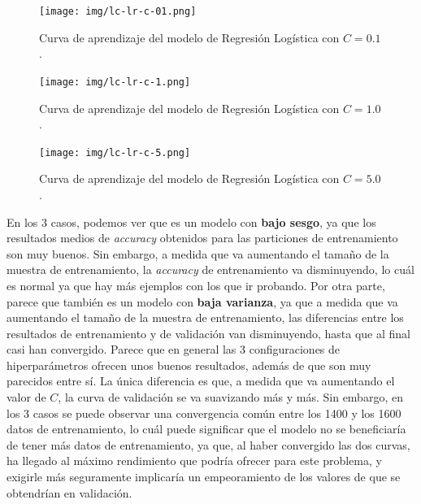 \documentclass[11pt,a4paper]{article}
\begin{document}
\begin{figure}[H]
\centering
\begin{minipage}{.5\textwidth}
    \centering
    \texttt{[image: img/lc-lr-c-01.png]}
    \caption{Curva de aprendizaje del modelo de Regresión Logística con $C=0.1$.}
    \label{fig:lc-lr-c-01}
\end{minipage}%
\begin{minipage}{.5\textwidth}
    \centering
    \texttt{[image: img/lc-lr-c-1.png]}
    \caption{Curva de aprendizaje del modelo de Regresión Logística con $C=1.0$.}
    \label{fig:lc-lr-c-1}
\end{minipage}
\end{figure}

\begin{figure}[H]
    \centering
    \texttt{[image: img/lc-lr-c-5.png]}
    \caption{Curva de aprendizaje del modelo de Regresión Logística con $C=5.0$.}
    \label{fig:lc-lr-c-5}
\end{figure}

En los 3 casos, podemos ver que es un modelo con \textbf{bajo sesgo}, ya que los resultados medios de \textit{accuracy} obtenidos para las particiones de
entrenamiento son muy buenos. Sin embargo, a medida que va aumentando el tamaño de la muestra de entrenamiento, la \textit{accuracy} de entrenamiento
va disminuyendo, lo cuál es normal ya que hay más ejemplos con los que ir probando. Por otra parte, parece que también es un modelo con \textbf{baja
varianza}, ya que a medida que va aumentando el tamaño de la muestra de entrenamiento, las diferencias entre los resultados de entrenamiento y de validación
van disminuyendo, hasta que al final casi han convergido. Parece que en general las 3 configuraciones de hiperparámetros ofrecen unos buenos
resultados, además de que son muy parecidos entre sí. La única diferencia es que, a medida que va aumentando el valor de $C$, la curva de validación
se va suavizando más y más. Sin embargo, en los 3 casos se puede observar una convergencia común entre los 1400 y los 1600 datos de entrenamiento,
lo cuál puede significar que el modelo no se beneficiaría de tener más datos de entrenamiento, ya que, al haber convergido las dos curvas, ha llegado
al máximo rendimiento que podría ofrecer para este problema, y exigirle más seguramente implicaría un empeoramiento de los valores de que se
obtendrían en validación.
\end{document}
